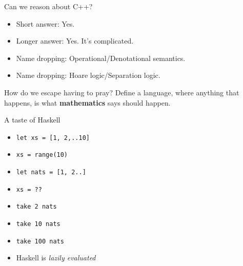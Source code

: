 \documentclass[8pt]{beamer}
\newcommand{\py}[1]{\texttt{#1}}
\newcommand{\hs}[1]{\texttt{#1}}
\begin{document}
\begin{frame}[fragile]{Can we reason about C++?}
    \pause
    \begin{itemize}
    \item Short answer: Yes. \pause
    \item Longer answer: Yes. It's complicated. \pause
    \item Name dropping: Operational/Denotational semantics. \pause
    \item Name dropping: Hoare logic/Separation logic. \pause
    \end{itemize}
\end{frame}


\begin{frame}[fragile]{How do we escape having to pray?}
    \pause
    Define a language, \pause where anything that happens, \pause is what \textbf{mathematics} says should happen.
    \pause

\end{frame}

\begin{frame}[fragile]{A taste of Haskell}
    \begin{itemize}
        \item \hs{let xs = [1, 2,..10]} \pause
        \item \py{xs = range(10)} \pause
        \item \hs{let nats = [1, 2..]} \pause
        \item \py{xs = ??} \pause
        \item \hs{take 2 nats} \pause
        \item \hs{take 10 nats} \pause
        \item \hs{take 100 nats} \pause
        \item Haskell is \emph{lazily evaluated} \pause
    \end{itemize}
\end{frame}
\end{document}
